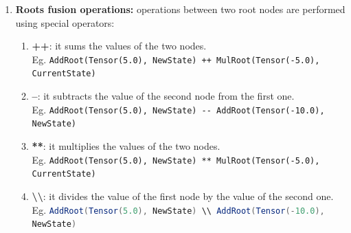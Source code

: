 \documentclass[12pt,a4paper,openright,twoside]{book}
\begin{document}
\begin{enumerate}
    \item \textbf{Roots fusion operations:} 
          operations between two root nodes are performed using special operators:
          \begin{enumerate}
              \item \textbf{++}: 
                    it sums the values of the two nodes. \\
                    Eg. \lstinline|AddRoot(Tensor(5.0), NewState) ++ MulRoot(Tensor(-5.0), CurrentState)|
              \item \textbf{--}: 
                    it subtracts the value of the second node from the first one. \\
                    Eg. \lstinline|AddRoot(Tensor(5.0), NewState) -- AddRoot(Tensor(-10.0), NewState)|
              \item \textbf{**}: 
                    it multiplies the values of the two nodes. \\
                    Eg. \lstinline|AddRoot(Tensor(5.0), NewState) ** MulRoot(Tensor(-5.0), CurrentState)| 
              \item \textbf{\textbackslash\textbackslash}: 
                    it divides the value of the first node by the value of the second one. \\
                    Eg. \lstinline[language=scala]|AddRoot(Tensor(5.0), NewState) \\ AddRoot(Tensor(-10.0), NewState)| 
          \end{enumerate}
          

\end{enumerate}
\end{document}
